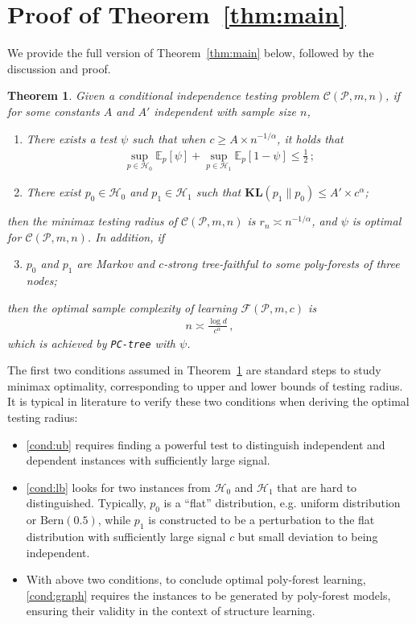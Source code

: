 \documentclass{article}
\newtheorem{theorem}{Theorem}[section]
\theoremstyle{definition}
\theoremstyle{definition}
\theoremstyle{definition}
\theoremstyle{definition}
\theoremstyle{definition}
\theoremstyle{definition}
\theoremstyle{remark}
\theoremstyle{remark}
\newcommand{\E}{\mathbb{E}}
\newcommand{\dpdm}{m}
\newcommand{\dd}{d}
\newcommand{\ciclass}{\mathcal{C}}
\newcommand{\pfclass}{\mathcal{F}}
\newcommand{\hone}{\mathcal{H}_1}
\newcommand{\hzero}{\mathcal{H}_0}
\begin{document}
\section{Proof of Theorem~\ref{thm:main}}\label{app:main}
We provide the full version of Theorem~\ref{thm:main} below, followed by the discussion and proof.
\begin{theorem}\label{thm:main:full}
    Given a conditional independence testing problem $\ciclass(\mathcal{P},\dpdm,n)$, if for some constants $A$ and $A'$ independent with sample size $n$, 
    \begin{enumerate}[label=(C\arabic*)]
        \item There exists a test $\psi$ such that when $c\ge A\times  n^{-1/\alpha}$, it holds that
        \begin{align*}
            \sup_{p\in \hzero}\E_p [\psi] + \sup_{p\in\hone}\E_p[1-\psi] \le \frac{1}{2} \,;
        \end{align*} 
        \label{cond:ub}
        \item There exist $p_0\in\hzero$ and $p_1\in \hone$ such that $\mathbf{KL}(p_1 \|p_0)\le A'\times c^{\alpha}$; \label{cond:lb}
    \end{enumerate}
    then the minimax testing radius of $\ciclass(\mathcal{P},\dpdm,n)$ is $r_n\asymp n^{-1/\alpha}$, and $\psi$ is optimal for $\ciclass(\mathcal{P},\dpdm,n)$.
    In addition, if 
    \begin{enumerate}[label=(C\arabic*)]
        \setcounter{enumi}{2}
        \item $p_0$ and $p_1$ are Markov and $c$-strong tree-faithful to some poly-forests of three nodes; \label{cond:graph}
    \end{enumerate}
    then the optimal sample complexity of learning $\pfclass(\mathcal{P},\dpdm,c)$ is
    \begin{align*}
        n \asymp \frac{\log\dd}{c^\alpha} \,,
    \end{align*}
    which is achieved by \texttt{PC-tree} with $\psi$.
\end{theorem}
The first two conditions assumed in Theorem~\ref{thm:main:full} are standard steps to study minimax optimality, corresponding to upper and lower bounds of testing radius. It is typical in literature to verify these two conditions when deriving the optimal testing radius:
\begin{itemize}
    \item \ref{cond:ub} requires finding a powerful test to distinguish independent and dependent instances with sufficiently large signal. 
    \item \ref{cond:lb} looks for two instances from $\hzero$ and $\hone$ that are hard to distinguished. Typically, $p_0$ is a ``flat'' distribution, e.g. uniform distribution or $\text{Bern}(0.5)$, while $p_1$ is constructed to be a perturbation to the flat distribution with sufficiently large signal $c$ but small deviation to being independent.
    \item With above two conditions, to conclude optimal poly-forest learning, \ref{cond:graph} requires the instances to be generated by poly-forest models, ensuring their validity in the context of structure learning. 
\end{itemize}
\end{document}
